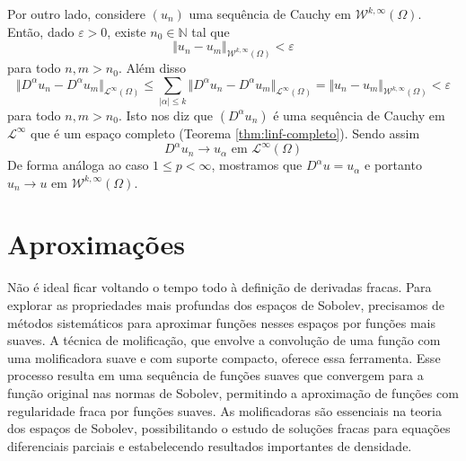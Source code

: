 \documentclass[a4paper, 11pt]{book}
\theoremstyle{definition}
\newcommand{\bN}{\mathbb{N}}
\newcommand{\cL}{\mathcal{L}}
\newcommand{\cW}{\mathcal{W}}
\begin{document}
\begin{prf}
    Por outro lado, considere $(u_n)$ uma sequência de Cauchy em $\cW^{k,\infty}(\Omega)$. Então, dado $\varepsilon > 0$, existe $n_0 \in \bN$ tal que
    \[
        \Vert u_n - u_m \Vert_{\cW^{k,\infty}(\Omega)} < \varepsilon
    \]
    para todo $n,m > n_0$. Além disso
    \[
        \Vert D^\alpha u_n - D^\alpha u_m \Vert_{\cL^\infty(\Omega)} \leqslant \sum_{|\alpha| \leqslant k} \Vert D^\alpha u_n - D^\alpha u_m \Vert_{\cL^\infty(\Omega)} = \Vert u_n - u_m \Vert_{\cW^{k,\infty}(\Omega)} < \varepsilon
    \]
    para todo $n,m > n_0$. Isto nos diz que $(D^\alpha u_n)$ é uma sequência de Cauchy em $\cL^\infty$ que é um espaço completo (Teorema \ref{thm:linf-completo}). Sendo assim
    \[
        D^{\alpha} u_n \to u_\alpha \text{ em } \cL^\infty(\Omega)
    \]
    De forma análoga ao caso $1 \leqslant p < \infty$, mostramos que $D^\alpha u = u_\alpha$ e portanto $u_n \to u$ em $\cW^{k,\infty}(\Omega)$.
\end{prf}

\section{Aproximações}

Não é ideal ficar voltando o tempo todo à definição de derivadas fracas. Para explorar as propriedades mais profundas dos espaços de Sobolev, precisamos de métodos sistemáticos para aproximar funções nesses espaços por funções mais suaves. A técnica de molificação, que envolve a convolução de uma função com uma molificadora suave e com suporte compacto, oferece essa ferramenta. Esse processo resulta em uma sequência de funções suaves que convergem para a função original nas normas de Sobolev, permitindo a aproximação de funções com regularidade fraca por funções suaves. As molificadoras são essenciais na teoria dos espaços de Sobolev, possibilitando o estudo de soluções fracas para equações diferenciais parciais e estabelecendo resultados importantes de densidade.
\end{document}

